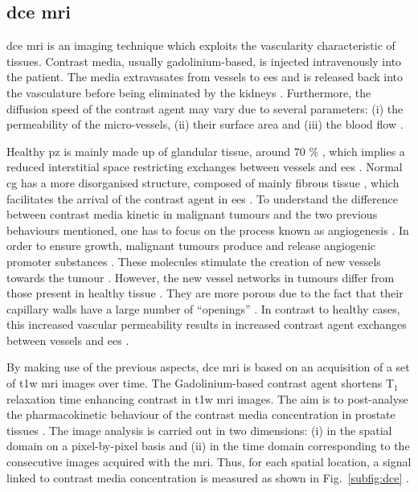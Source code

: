 \subsection{\acs*{dce} \ac{mri}}\label{subsec:chp2:imaging:dce}
\ac{dce} \ac{mri} is an imaging technique which exploits the vascularity characteristic of tissues.
Contrast media, usually gadolinium-based, is injected intravenously into the patient.
The media extravasates from vessels to \ac{ees} and is released back into the vasculature before being eliminated by the kidneys \cite{Gribbestad2005}.
Furthermore, the diffusion speed of the contrast agent may vary due to several parameters: (i) the permeability of the micro-vessels, (ii) their surface area and (iii) the blood flow \cite{Padhani2002}.

Healthy \ac{pz} is mainly made up of glandular tissue, around 70 \% \cite{Choi2007}, which implies a reduced interstitial space restricting exchanges between vessels and \ac{ees} \cite{Buckley2004,Niekerk2009}.
Normal \ac{cg} has a more disorganised structure, composed of mainly fibrous tissue \cite{Choi2007,Hoeks2011}, which facilitates the arrival of the contrast agent in \ac{ees} \cite{Niekerk2013}.
To understand the difference between contrast media kinetic in malignant tumours and the two previous behaviours mentioned, one has to focus on the process known as angiogenesis \cite{Carmeliet2000}.
In order to ensure growth, malignant tumours produce and release angiogenic promoter substances \cite{Carmeliet2000}.
These molecules stimulate the creation of new vessels towards the tumour \cite{Carmeliet2000}.
However, the new vessel networks in tumours differ from those present in healthy tissue \cite{Gribbestad2005}.
They are more porous due to the fact that their capillary walls have a large number of ``openings'' \cite{Gribbestad2005,Choi2007}.
In contrast to healthy cases, this increased vascular permeability results in increased contrast agent exchanges between vessels and \ac{ees} \cite{Verma2012}.

By making use of the previous aspects, \ac{dce} \ac{mri} is based on an acquisition of a set of \ac{t1w} \ac{mri} images over time.
The Gadolinium-based contrast agent shortens T$_1$ relaxation time enhancing contrast in \ac{t1w} \ac{mri} images.
The aim is to post-analyse the pharmacokinetic behaviour of the contrast media concentration in prostate tissues \cite{Verma2012}.
The image analysis is carried out in two dimensions: (i) in the spatial domain on a pixel-by-pixel basis and (ii) in the time domain corresponding to the consecutive images acquired with the \ac{mri}.
Thus, for each spatial location, a signal linked to contrast media concentration is measured as shown in Fig.~\ref{subfig:dce} \cite{Tofts2010}. 

